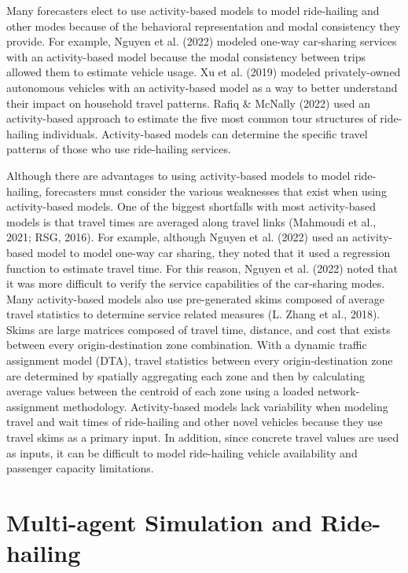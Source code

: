 \documentclass[fancy, masters]{byuthesis}
\begin{document}
Many forecasters elect to use activity-based models to model ride-hailing and other modes because of the behavioral representation and modal consistency they provide. For example, Nguyen et al. (2022) modeled one-way car-sharing services with an activity-based model because the modal consistency between trips allowed them to estimate vehicle usage. Xu et al. (2019) modeled privately-owned autonomous vehicles with an activity-based model as a way to better understand their impact on household travel patterns. Rafiq \& McNally (2022) used an activity-based approach to estimate the five most common tour structures of ride-hailing individuals. Activity-based models can determine the specific travel patterns of those who use ride-hailing services.

Although there are advantages to using activity-based models to model ride-hailing, forecasters must consider the various weaknesses that exist when using activity-based models. One of the biggest shortfalls with most activity-based models is that travel times are averaged along travel links (Mahmoudi et al., 2021; RSG, 2016). For example, although Nguyen et al. (2022) used an activity-based model to model one-way car sharing, they noted that it used a regression function to estimate travel time. For this reason, Nguyen et al. (2022) noted that it was more difficult to verify the service capabilities of the car-sharing modes. Many activity-based models also use pre-generated skims composed of average travel statistics to determine service related measures (L. Zhang et al., 2018). Skims are large matrices composed of travel time, distance, and cost that exists between every origin-destination zone combination. With a dynamic traffic assignment model (DTA), travel statistics between every origin-destination zone are determined by spatially aggregating each zone and then by calculating average values between the centroid of each zone using a loaded network-assignment methodology. Activity-based models lack variability when modeling travel and wait times of ride-hailing and other novel vehicles because they use travel skims as a primary input. In addition, since concrete travel values are used as inputs, it can be difficult to model ride-hailing vehicle availability and passenger capacity limitations.

\hypertarget{lit-mas}{%
\section{Multi-agent Simulation and Ride-hailing}\label{lit-mas}}
\end{document}
